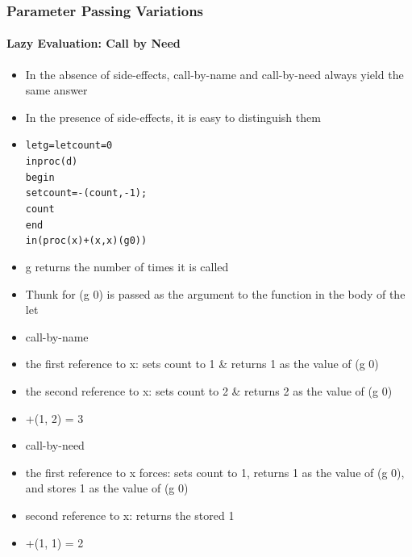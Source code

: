 \documentclass{beamer}
\begin{document}
\begin{frame}[fragile]
\frametitle{Parameter Passing Variations}
\framesubtitle{Lazy Evaluation: Call by Need}
\begin{scriptsize}
\begin{itemize}
\item<1-> In the absence of side-effects, call-by-name and call-by-need always yield the same answer

\item<2-> In the presence of side-effects, it is easy to distinguish them

\item<3->
\begin{alltt}
let g = let count = 0
        in proc (d)
	         begin
               set count = -(count, -1);
               count
	       end
in (proc (x) +(x, x) (g 0) )
\end{alltt}

\item<4-> g returns the number of times it is called

\item<4-> Thunk for (g 0) is passed as the argument to the function in the body of the let

\item<5-> call-by-name

\item<6-> the first reference to x: sets count to 1 \& returns 1 as the value of (g 0)

\item<7-> the second reference to x: sets count to 2 \& returns 2 as the value of (g 0)

\item<8-> +(1, 2) = 3

\item<9-> call-by-need

\item<10-> the first reference to x forces: sets count to 1, returns 1 as the value of (g 0), and stores 1 as the value of (g 0)
\item<11-> second reference to x: returns the stored 1

\item<12>  +(1, 1) = 2

\end{itemize}
\end{scriptsize}
\end{frame}
\end{document}
